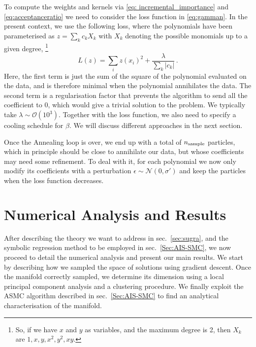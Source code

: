 \documentclass[11pt,a4paper]{article}
\newcommand{\bd}[1]{\marginpar{\parbox{\marginparwidth}{\boldmath $\Longleftarrow$}}{\boldmath\bfseries (bd: #1)}}
\begin{document}
		To compute the weights and kernels via \eqref{eq: incremental_importance} and \eqref{eq:acceptanceratio} we need to consider the loss function in \eqref{eq:gamman}.
In the present context, we use the following loss, where the polynomials have been parameterised as $z = \sum_k c_k X_k$ with $X_k$ denoting the possible monomials up to a given degree,%
\footnote{So, if we have $x$ and $y$ as variables, and the maximum degree is 2, then $X_k$ are $1, x, y, x^2, y^2, x y$.}
		\begin{equation} \label{eq:lossreg}
			L(z) = \sum_{i} z(x_i)^2 + \frac{\lambda}{\sum_k |c_k|}\,.
		\end{equation}
Here, the first term is just the sum of the square of the polynomial evaluated on the data, and is therefore minimal when the polynomial annihilates the data. 
The second term is a regularisation factor that prevents the algorithm to send all the coefficient to 0, which would give a trivial solution to the problem. 
We typically take $\lambda \sim \mathcal{O}(10^3)$. 
Together with the loss function, we also need to specify a cooling schedule for $\beta$. We will discuss different approaches in the next section.
		
		Once the Annealing loop is over, we end up with a total of $n_{\rm sample}$ particles, which in principle should be close to annihilate our data, but whose coefficients may need some refinement. To deal with it, for each polynomial we now only modify its coefficients with a perturbation $\epsilon \sim \mathcal{N}(0, \sigma')$ and keep the particles when the loss function decreases.

	
\section{Numerical Analysis and Results} \label{sec:results}
After describing the theory we want to address in sec.~\ref{sec:sugra}, and the symbolic regression method to be employed in sec.~\ref{Sec:AIS-SMC}, we now proceed to detail the numerical analysis and present our main results. 
We start by describing how we sampled the space of solutions using gradient descent. Once the manifold correctly sampled, we determine its dimension using a local principal component analysis and a clustering procedure. We finally exploit the ASMC algorithm described in sec.~\ref{Sec:AIS-SMC} to find an analytical characterisation of the manifold.
\end{document}
